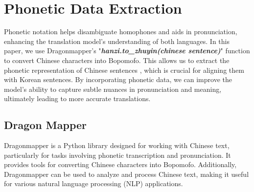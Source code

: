 \documentclass[PhD]{PHlab-thesis}
\begin{document}


\section{Phonetic Data Extraction}
Phonetic notation helps disambiguate homophones and aids in pronunciation, enhancing the translation model's understanding of both languages. In this paper, we use Dragonmapper's  "\textbf{\textit{hanzi.to\_zhuyin(chinese sentence)}}"  function to convert Chinese characters into Bopomofo. This allows us to extract the phonetic representation of Chinese sentences , which is crucial for aligning them with Korean sentences. By incorporating phonetic data, we can improve the model's ability to capture subtle nuances in pronunciation and meaning, ultimately leading to more accurate translations.

\subsection{Dragon Mapper}
Dragonmapper\cite{dragonMapper} is a Python library designed for working with Chinese text, particularly for tasks involving phonetic transcription and pronunciation. It provides tools for converting Chinese characters into Bopomofo. Additionally, Dragonmapper can be used to analyze and process Chinese text, making it useful for various natural language processing (NLP) applications.
\end{document}
